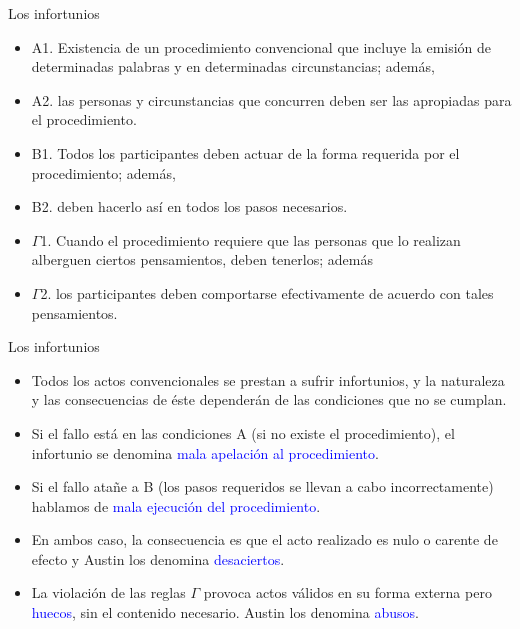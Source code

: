 \documentclass{beamer}
\begin{document}
\begin{frame}{Los infortunios}

\begin{itemize}
	\item A1. Existencia de un procedimiento convencional que incluye la emisión de determinadas palabras y en determinadas circunstancias; además,
	\item A2. las personas y circunstancias que concurren deben ser las apropiadas para el procedimiento.
	\item B1. Todos los participantes deben actuar de la forma requerida por el procedimiento; además,
	\item B2. deben hacerlo así en todos los pasos necesarios.
	\item $\Gamma$1. Cuando el procedimiento requiere que las personas que lo realizan alberguen ciertos pensamientos, deben tenerlos; además
	\item $\Gamma$2. los participantes deben comportarse efectivamente de acuerdo con tales pensamientos.
\end{itemize}

\end{frame}

\begin{frame}{Los infortunios}

\begin{itemize}
	\item Todos los actos convencionales se prestan a sufrir infortunios, y la naturaleza y las consecuencias de éste dependerán de las condiciones que no se cumplan. 
	\item Si el fallo está en las condiciones A (si no existe el procedimiento), el infortunio se denomina \textcolor{blue}{mala apelación al procedimiento}.
	\item Si el fallo atañe a B (los pasos requeridos se llevan a cabo incorrectamente) hablamos de \textcolor{blue}{mala ejecución del procedimiento}.
	\item En ambos caso, la consecuencia es que el acto realizado es nulo o carente de efecto y Austin los denomina \textcolor{blue}{desaciertos}.
	\item La violación de las reglas $\Gamma$ provoca actos válidos en su forma externa pero \textcolor{blue}{huecos}, sin el contenido necesario. Austin los denomina \textcolor{blue}{abusos}.
\end{itemize}

\end{frame}
\end{document}
